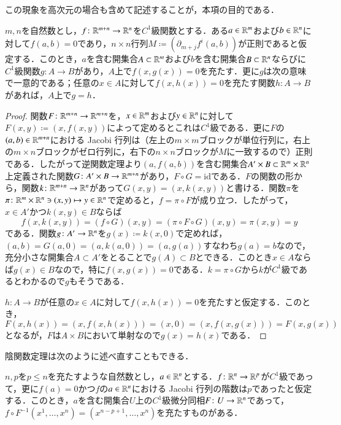 この現象を高次元の場合も含めて記述することが，本項の目的である．

\begin{thm}[陰関数定理]$m,n$を自然数とし，$f \colon \mathbb{R}^{m+n} \to \mathbb{R}^n$を$C^1$級関数とする．ある$a \in \mathbb{R}^m$および$b \in \mathbb{R}^n$に対して$f(a,b)=0$であり，$n \times n$行列$M \coloneqq (\partial_{m+j} f^i (a,b))$が正則であると仮定する．このとき，$a$を含む開集合$A \subset \mathbb{R}^m$および$b$を含む開集合$B \subset \mathbb{R}^n$ならびに$C^1$級関数$g \colon A \to B$があり，$A$上で$f(x,g(x))=0$を充たす．更に$g$は次の意味で一意的である；任意の$x \in A$に対して$f(x,h(x))=0$を充たす関数$h \colon A \to B$があれば，$A$上で$g=h$．
\end{thm}

\begin{proof}
関数$F \colon \mathbb{R}^{m+n} \to \mathbb{R}^{m+n}$を，$x\in \mathbb{R}^m$および$y \in \mathbb{R}^n$に対して$F(x,y) \coloneqq (x,f(x,y))$によって定めるとこれは$C^1級$である．更に$F$の$(a,b) \in \mathbb{R}^{m+n}$における Jacobi 行列は（左上の$m \times m$ブロックが単位行列に，右上の$m \times n$ブロックがゼロ行列に，右下の$n \times n$ブロックが$M$に一致するので）正則である．したがって逆関数定理より$(a,f(a,b))$を含む開集合$A' \times B \subset \mathbb{R}^m \times \mathbb{R}^n$上定義された関数$G \colon A' \times B \to \mathbb{R}^{m+n}$があり，$F \circ G = \mathrm{id}$である．$F$の関数の形から，関数$k \colon \mathbb{R}^{m+n} \to \mathbb{R}^n$があって$G(x,y) = (x,k(x,y))$と書ける．関数$\pi$を$\pi \colon \mathbb{R}^m \times \mathbb{R}^n \ni (x,y) \mapsto y \in \mathbb{R}^n$で定めると，$f = \pi \circ F$が成り立つ．したがって，$x \in A'$かつ$k(x,y) \in B$ならば
\begin{equation}
f(x,k(x,y)) = (f \circ G)(x,y) = (\pi \circ F \circ G)(x,y) = \pi (x,y) = y
\end{equation}である．関数$g \colon A' \to \mathbb{R}^n$を$g(x) \coloneqq k(x,0)$で定めれば，$(a,b)=G(a,0)=(a,k(a,0))=(a,g(a))$すなわち$g(a)=b$なので，充分小さな開集合$A \subset A'$をとることで$g(A) \subset B$とできる．このとき$x \in A$ならば$g(x) \in B$なので，特に$f(x,g(x))=0$である．$k = \pi \circ G$から$k$が$C^1$級であるとわかるので$g$もそうである．

$h \colon A \to B$が任意の$x \in A$に対して$f(x,h(x))=0$を充たすと仮定する．このとき，$F(x,h(x)) = (x,f(x,h(x))) = (x,0) = (x,f(x,g(x))) = F(x,g(x))$となるが，$F$は$A \times B$において単射なので$g(x)=h(x)$である．
\end{proof}

陰関数定理は次のように述べ直すこともできる．

\begin{thm}
$n,p$を$p \leq n$を充たすような自然数とし，$a \in \mathbb{R}^n$とする．$f \colon \mathbb{R}^n \to \mathbb{R}^p$が$C^1$級であって，更に$f(a) = 0$かつ$f$の$a \in \mathbb{R}^n$における Jacobi 行列の階数は$p$であったと仮定する．このとき，$a$を含む開集合$U$上の$C^1$級微分同相$F \colon U \to \mathbb{R}^n$であって，$f \circ F^{-1} (x^1, \dots, x^n) = (x^{n-p +1}, \dots, x^n)$を充たすものがある．
\end{thm}

